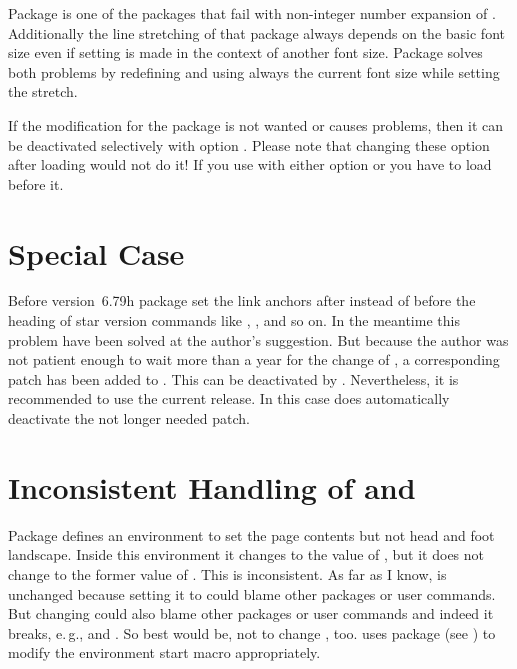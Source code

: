 Package  is one of the
packages that fail with non-integer number expansion of
. Additionally the line stretching of that package always
depends on the basic font size even if setting is made in the context of
another font size. Package  solves both problems by
redefining  and  using always the
current font size while setting the stretch.

If the modification for the package is not wanted or causes problems,
then it can be deactivated selectively with option
.
Please note that changing these option after loading
 would not do it! If you use  with
either option  or  you have to
load  before it.


\section{Special Case }

Before version~6.79h package  set the link anchors after
instead of before the heading of star version commands like ,
, and so on. In the meantime this problem have been solved at
the \KOMAScript{} author's suggestion. But because the \KOMAScript{} author
was not patient enough to wait more than a year for the change of
, a corresponding patch has been added to
. This can be deactivated by
. Nevertheless, it is recommended to use the
current  release. In this case  does
automatically deactivate the not longer needed patch.%


\section{Inconsistent Handling of  and }

Package  defines an
environment  to set the page
contents but not head and foot landscape. Inside this environment it changes
 to the value of
, but it does not change  to the former
value of .  This is inconsistent. As far as I know,
 is unchanged because setting it to 
could blame other packages or user commands. But changing 
could also blame other packages or user commands and indeed it breaks, e.\,g.,
 and
. So best would be, not to change
, too.  uses package  (see
\cite{package:xpatch}) to modify the environment start macro 
appropriately.

